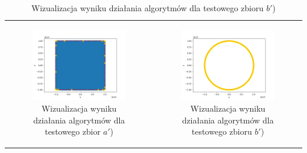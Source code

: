 \documentclass[a4paper]{article}
\begin{document}
\begin{table}[H]
    \centering
    \begin{tabular}{cc}
        
        \begin{subfigure}{0.5\textwidth}
            \includegraphics[width=\columnwidth]{tests/graham/graham_points_a_test.png}
            \caption{Wizualizacja wyniku działania algorytmów dla testowego zbior $a'$)}
            \label{fig:points_a_test}
        \end{subfigure} & 
        \begin{subfigure}{0.5\textwidth}
            \includegraphics[width=\columnwidth]{tests/graham/graham_points_b_test.png}
            \caption{Wizualizacja wyniku działania algorytmów dla testowego zbioru $b'$)}
            \label{fig:points_b_test}
        \end{subfigure} \\


\end{tabular}
\end{table}
\end{document}
